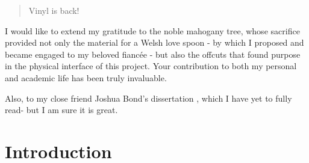     \begin{abstract} %
      Vinyl is back!
    
    \end{abstract}%
    \clearpage
    
    
    
    \uomdeclarations %
    
    
    
    \begin{uomacknowledgements}
    I would like to extend my gratitude to the noble mahogany tree, whose sacrifice provided not only the material for a Welsh love spoon - by which I proposed and became engaged to my beloved fiancée - but also the offcuts that found purpose in the physical interface of this project. Your contribution to both my personal and academic life has been truly invaluable.
    
    Also, to my close friend Joshua Bond’s dissertation \cite{jdbond}, which I have yet to fully read- but I am sure it is great.
    \end{uomacknowledgements}
    
    
    
    \section{Introduction}
    
    
    
